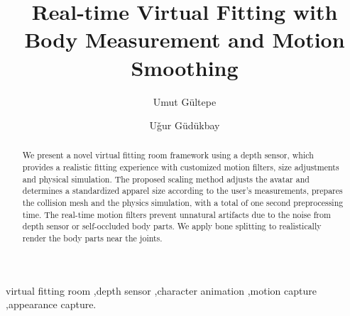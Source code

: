 \documentclass[number,preprint,review,12pt]{elsarticle}
\begin{document}
\begin{frontmatter}



\title{Real-time Virtual Fitting with \\Body Measurement and Motion Smoothing}


\author{Umut G\"{u}ltepe}
\author{U\v{g}ur G\"{u}d\"{u}kbay}

\address{Bilkent University, Department of Computer Engineering, Bilkent 06800 Ankara Turkey}

\begin{abstract}
We present a novel virtual fitting room framework using a depth sensor, which provides a realistic fitting experience with customized motion filters, size adjustments and physical simulation. The proposed scaling method adjusts the avatar and determines a standardized apparel size according to the user's measurements, prepares the collision mesh and the physics simulation, with a total of one second preprocessing time. The real-time motion filters prevent unnatural artifacts due to the noise from depth sensor or self-occluded body parts. We apply bone splitting to realistically render the body parts near the joints.
\end{abstract}

\begin{keyword}
virtual fitting room \sep depth sensor \sep character animation \sep motion capture \sep appearance capture.

\end{keyword}

\end{frontmatter}
\end{document}
